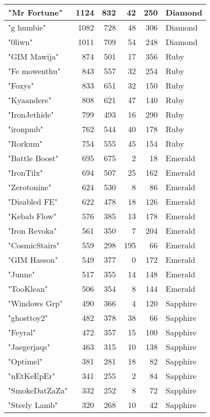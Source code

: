 \documentclass{article}
\begin{document}
\begin{table}[htbp]
\begin{tabular}{|l|r|r|r|r|l|}
"Mr Fortune" & 1124 & 832 & 42 & 250 & Diamond \\ \hline
"g humbie" & 1082 & 728 & 48 & 306 & Diamond \\ \hline
"0liwn" & 1011 & 709 & 54 & 248 & Diamond \\ \hline
"GIM Mawija" & 874 & 501 & 17 & 356 & Ruby \\ \hline
"Fe mowenthu" & 843 & 557 & 32 & 254 & Ruby \\ \hline
"Foxys" & 833 & 651 & 32 & 150 & Ruby \\ \hline
"Kyaandere" & 808 & 621 & 47 & 140 & Ruby \\ \hline
"IronJethide" & 799 & 493 & 16 & 290 & Ruby \\ \hline
"ironpmb" & 762 & 544 & 40 & 178 & Ruby \\ \hline
"Rorkum" & 754 & 555 & 45 & 154 & Ruby \\ \hline
"Battle Boost" & 695 & 675 & 2 & 18 & Emerald \\ \hline
"IronTilx" & 694 & 507 & 25 & 162 & Emerald \\ \hline
"Zerotonine" & 624 & 530 & 8 & 86 & Emerald \\ \hline
"Disabled FE" & 622 & 478 & 18 & 126 & Emerald \\ \hline
"Kebab Flow" & 576 & 385 & 13 & 178 & Emerald \\ \hline
"Iron Revoka" & 561 & 350 & 7 & 204 & Emerald \\ \hline
"CosmicStairs" & 559 & 298 & 195 & 66 & Emerald \\ \hline
"GIM Hasson" & 549 & 377 & 0 & 172 & Emerald \\ \hline
"Junne" & 517 & 355 & 14 & 148 & Emerald \\ \hline
"TooKlean" & 506 & 354 & 8 & 144 & Emerald \\ \hline
"Windows Grp" & 490 & 366 & 4 & 120 & Sapphire \\ \hline
"ghosttoy2" & 482 & 378 & 38 & 66 & Sapphire \\ \hline
"Feyral" & 472 & 357 & 15 & 100 & Sapphire \\ \hline
"Jaegerjaqs" & 463 & 315 & 10 & 138 & Sapphire \\ \hline
"Optimel" & 381 & 281 & 18 & 82 & Sapphire \\ \hline
"nEtKeEpEr" & 341 & 255 & 2 & 84 & Sapphire \\ \hline
"SmokeDatZaZa" & 332 & 252 & 8 & 72 & Sapphire \\ \hline
"Steely Lamb" & 320 & 268 & 10 & 42 & Sapphire \\ \hline

\end{tabular}
\end{table}
\end{document}
